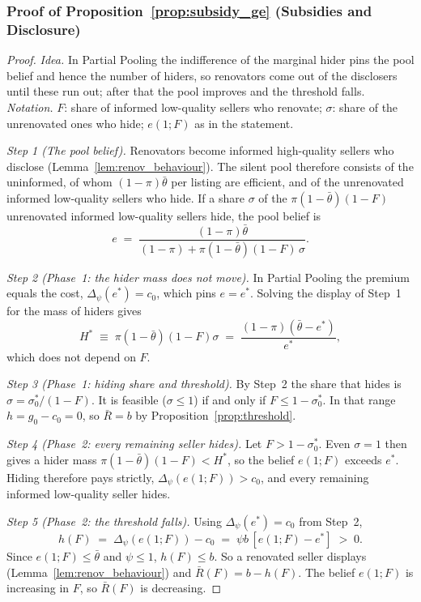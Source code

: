 \subsubsection*{Proof of Proposition~\ref{prop:subsidy_ge} (Subsidies and Disclosure)}

\begin{proof}\upshape
\emph{Idea.} In Partial Pooling the indifference of the marginal hider pins the pool belief and hence the number of hiders, so renovators come out of the disclosers until these run out; after that the pool improves and the threshold falls. \emph{Notation.} $F$: share of informed low-quality sellers who renovate; $\sigma$: share of the unrenovated ones who hide; $e(1;F)$ as in the statement.

\emph{Step 1 (The pool belief).} Renovators become informed high-quality sellers who disclose (Lemma~\ref{lem:renov_behaviour}). The silent pool therefore consists of the uninformed, of whom $(1-\pi)\bar\theta$ per listing are efficient, and of the unrenovated informed low-quality sellers who hide. If a share $\sigma$ of the $\pi(1-\bar\theta)(1-F)$ unrenovated informed low-quality sellers hide, the pool belief is
\begin{equation*}
    e\;=\;\frac{(1-\pi)\bar\theta}{(1-\pi)+\pi(1-\bar\theta)(1-F)\,\sigma}.
\end{equation*}

\emph{Step 2 (Phase~1: the hider mass does not move).} In Partial Pooling the premium equals the cost, $\Delta_\psi(e^*)=c_0$, which pins $e=e^*$. Solving the display of Step~1 for the mass of hiders gives
\begin{equation*}
    H^*\;\equiv\;\pi(1-\bar\theta)(1-F)\sigma\;=\;\frac{(1-\pi)(\bar\theta-e^*)}{e^*},
\end{equation*}
which does not depend on $F$.

\emph{Step 3 (Phase~1: hiding share and threshold).} By Step~2 the share that hides is $\sigma=\sigma_0^*/(1-F)$. It is feasible ($\sigma\le1$) if and only if $F\le1-\sigma_0^*$. In that range $h=g_0-c_0=0$, so $\bar R=b$ by Proposition~\ref{prop:threshold}.

\emph{Step 4 (Phase~2: every remaining seller hides).} Let $F>1-\sigma_0^*$. Even $\sigma=1$ then gives a hider mass $\pi(1-\bar\theta)(1-F)<H^*$, so the belief $e(1;F)$ exceeds $e^*$. Hiding therefore pays strictly, $\Delta_\psi(e(1;F))>c_0$, and every remaining informed low-quality seller hides.

\emph{Step 5 (Phase~2: the threshold falls).} Using $\Delta_\psi(e^*)=c_0$ from Step~2,
\begin{equation*}
    h(F)\;=\;\Delta_\psi(e(1;F))-c_0\;=\;\psi b\,[e(1;F)-e^*]\;>\;0.
\end{equation*}
Since $e(1;F)\le\bar\theta$ and $\psi\le1$, $h(F)\le b$. So a renovated seller displays (Lemma~\ref{lem:renov_behaviour}) and $\bar R(F)=b-h(F)$. The belief $e(1;F)$ is increasing in $F$, so $\bar R(F)$ is decreasing.


\end{proof}
